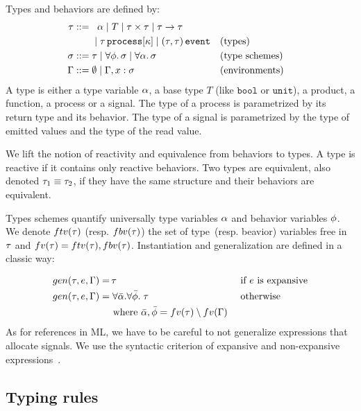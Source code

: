 \documentclass[9pt,preprint]{sigplanconf}
\newcommand{\sdeq}{::=}
\begin{document}
Types and behaviors are defined by:
\begin{align*}
\rt \sdeq &\;\;\; \rtvar \mid T \mid \rtprod{\rt}{\rt} \mid \rtarrow{\rt}{\rt} \\
    &\;\mid \rtproc{\rt}{\rk} \mid \rtsig{\rt}{\rt} && \text{(types)} \\
\rs \sdeq &\; \rt \mid \forall \effvar.\, \rs \mid \forall \rtvar.\, \rs && \text{(type schemes)} \\
\tyenv \sdeq&\; \emptyset \mid \tyenv \tyconcat x : \rs && \text{(environments)}
\end{align*}
A type is either a type variable $\alpha$, a base type $T$ (like $\mathtt{bool}$ or $\mathtt{unit}$), a product, a function, a process or a signal. The type of a process is parametrized by its return type and its behavior. The type of a signal is parametrized by the type of emitted values and the type of the read value.

We lift the notion of reactivity and equivalence from behaviors to types. A type is reactive if it contains only reactive behaviors. Two types are equivalent, also denoted $\tau_1 \equiv \tau_2$, if they have the same structure and their behaviors are equivalent.

Types schemes quantify universally type variables $\alpha$ and behavior variables $\phi$. We denote $ftv(\tau)$ (resp. $fbv(\tau)$) the set of type~(resp. beavior) variables free in $\tau$ and $fv(\tau) = ftv(\tau), fbv(\tau)$. Instantiation and generalization are defined in a classic way:
\vspace{-1.3em}
\begin{align*}
gen(\tau, e, \Gamma) = &\, \tau && \text { if $e$ is expansive} \\
gen(\tau, e, \Gamma) = &\; \forall \bar{\alpha}.\forall \bar{\phi}.\; \tau  && \text{ otherwise } \\
  & \text{ where }  \bar{\alpha}, \bar{\phi} = fv(\tau) \setminus fv(\Gamma)  
\end{align*}
As for references in ML, we have to be careful to not generalize expressions that allocate signals. We use the syntactic criterion of expansive and non-expansive expressions~\cite{Tofte:1990}.

\subsection{Typing rules}
\end{document}
